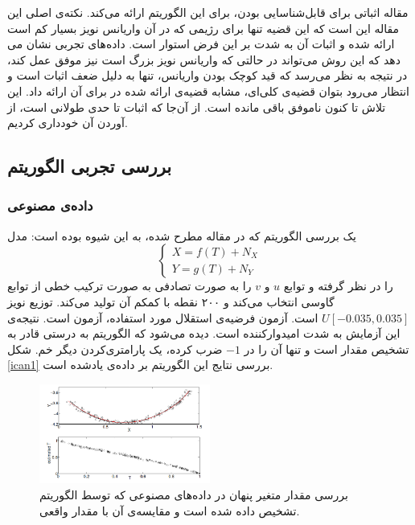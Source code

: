 \documentclass[a4paper,12pt]{article}
\begin{document}
مقاله اثباتی برای قابل‌شناسایی بودن،
برای  این الگوریتم ارائه می‌کند. نکته‌ی اصلی این مقاله این است که این قضیه تنها برای رژیمی که در آن واریانس نویز بسیار کم است ارائه شده و اثبات آن به شدت بر این فرض استوار است. داده‌های تجربی نشان می دهد که این روش می‌تواند در حالتی که واریانس نویز بزرگ است نیز موفق عمل کند، در نتیجه به نظر می‌رسد که قید کوچک بودن واریانس، تنها به دلیل ضعف اثبات است و انتظار می‌رود بتوان قضیه‌ی 
کلی‌ای، مشابه قضیه‌ی ارائه شده در
\cite{hoyer}
برای آن ارائه داد. این تلاش تا کنون ناموفق باقی مانده ‌است. از آن‌جا که اثبات تا حدی طولانی است، از آوردن  آن خودداری کردیم.


\subsection{بررسی تجربی الگوریتم}
\subsubsection{داده‌ی مصنوعی}
یک بررسی الگوریتم که در مقاله مطرح شده، به این شیوه بوده است:
 مدل
\begin{equation*}
\begin{cases}
X = f(T) + N_X\\
Y = g(T) + N_Y
\end{cases}
\end{equation*}
را در نظر گرفته و توابع $u$  و  $v$ را به صورت  تصادفی به صورت ترکیب خطی از توابع گاوسی انتخاب می‌کند و ۲۰۰ نقطه با کمکم آن تولید می‌کند. توزیع نویز
$U[−0.035,0.035]$
است. آزمون فرضیه‌ی استقلال مورد استفاده، آزمون 
است. نتیجه‌ی این آزمایش به شدت امیدوارکننده است. دیده‌ می‌شود که الگوریتم به درستی قادر به تشخیص مقدار 
است و تنها آن را در 
$-1$
ضرب کرده، یک پارامتری‌کردن دیگر خم. شکل
\eqref{ican1}
بررسی نتایج این الگوریتم بر داده‌ی یادشده است.
\begin{figure}[h!]
	\begin{center}
		\includegraphics[width=0.5\textwidth]{ican1.png}
	\end{center}
	\caption{
		بررسی مقدار متغیر پنهان در داده‌های مصنوعی که توسط الگوریتم تشخیص داده شده است و مقایسه‌ی آن با مقدار واقعی.
	}
\label{ican1}
\end{figure}
\end{document}
